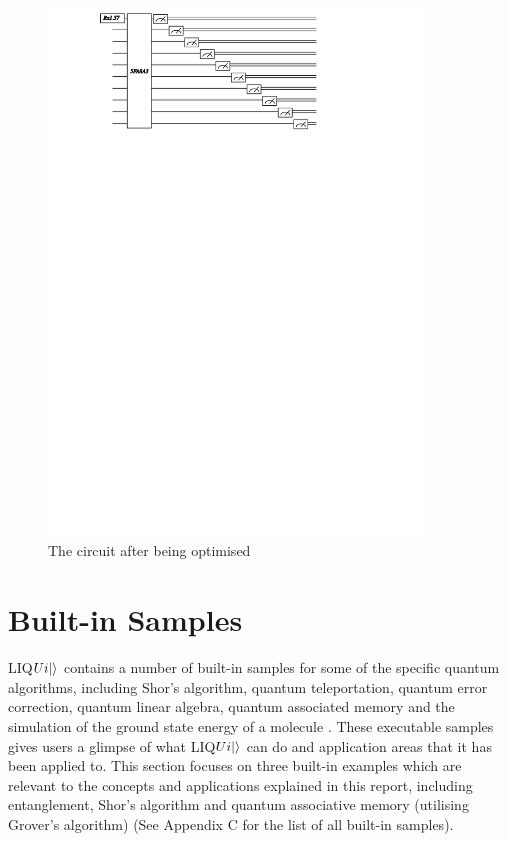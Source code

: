 \documentclass[12pt]{third-rep}
\begin{document}
\begin{figure}[ht]
\centering
\includegraphics[width=10cm]{circuit2}
\caption{The circuit after being optimised}
\end{figure}

\section{Built-in Samples}
LIQ$Ui{\left\vert{}\right\rangle}$ contains a number of built-in samples for some of the specific quantum algorithms, including Shor’s algorithm, quantum teleportation, quantum error correction, quantum linear algebra, quantum associated memory and the simulation of the ground state energy of a molecule \cite{liquid-manual}. These executable samples gives users a glimpse of what LIQ$Ui{\left\vert{}\right\rangle}$ can do and application areas that it has been applied to. This section focuses on three built-in examples which are relevant to the concepts and applications explained in this report, including entanglement, Shor’s algorithm and quantum associative memory (utilising Grover’s algorithm) (See Appendix C for the list of all built-in samples).
\end{document}
